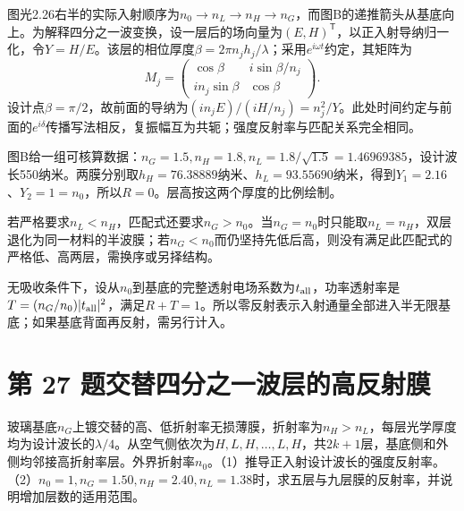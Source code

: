 \documentclass[UTF8,fontset=fandol,a4paper,11pt]{ctexart}
\begin{document}
图光2.26右半的实际入射顺序为$n_0\to n_L\to n_H\to n_G$，而图B的递推箭头从基底向上。为解释四分之一波变换，设一层后的场向量为$(E,H)^{\mathsf T}$，以正入射导纳归一化，令$Y=H/E$。该层的相位厚度$\beta=2\pi n_jh_j/\lambda$；采用$e^{i\omega t}$约定，其矩阵为
\[
M_j=\begin{pmatrix}
\cos\beta&i\sin\beta/n_j\\
in_j\sin\beta&\cos\beta
\end{pmatrix}.
\]
设计点$\beta=\pi/2$，故前面的导纳为$(in_jE)/(iH/n_j)=n_j^2/Y$。此处时间约定与前面的$e^{i\delta}$传播写法相反，复振幅互为共轭；强度反射率与匹配关系完全相同。

图B给一组可核算数据：$n_G=1.5,n_H=1.8,n_L=1.8/\sqrt{1.5}=1.46969385$，设计波长550纳米。两膜分别取$h_H=76.38889$纳米、$h_L=93.55690$纳米，得到$Y_1=2.16$、$Y_2=1=n_0$，所以$R=0$。层高按这两个厚度的比例绘制。

若严格要求$n_L<n_H$，匹配式还要求$n_G>n_0$。当$n_G=n_0$时只能取$n_L=n_H$，双层退化为同一材料的半波膜；若$n_G<n_0$而仍坚持先低后高，则没有满足此匹配式的严格低、高两层，需换序或另择结构。

无吸收条件下，设从$n_0$到基底的完整透射电场系数为$t_{\rm all}$，功率透射率是$T=(n_G/n_0)|t_{\rm all}|^2$，满足$R+T=1$。所以零反射表示入射通量全部进入半无限基底；如果基底背面再反射，需另行计入。




\section*{第 27 题\quad 交替四分之一波层的高反射膜}\label{q:27}

玻璃基底$n_G$上镀交替的高、低折射率无损薄膜，折射率为$n_H>n_L$，每层光学厚度均为设计波长的$\lambda/4$。从空气侧依次为$H,L,H,\ldots,L,H$，共$2k+1$层，基底侧和外侧均邻接高折射率层。外界折射率$n_0$。（1）推导正入射设计波长的强度反射率。（2）$n_0=1,n_G=1.50,n_H=2.40,n_L=1.38$时，求五层与九层膜的反射率，并说明增加层数的适用范围。
\end{document}
